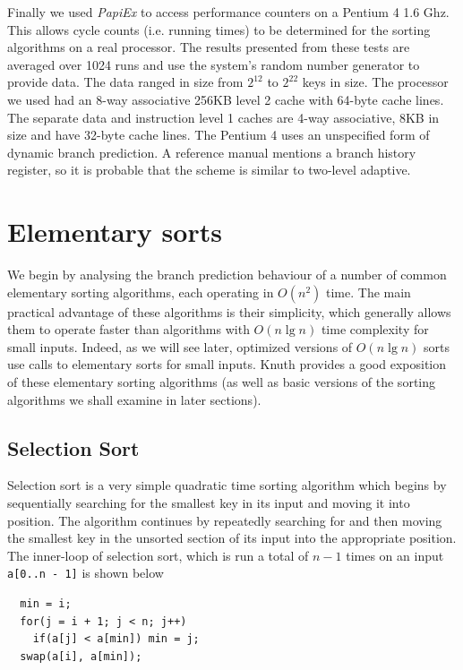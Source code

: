 \documentclass[acmtocl]{acmtrans2m}
\begin{document}
Finally we used \textit{PapiEx} \cite{PapiExManual} to access performance
counters on a Pentium 4 1.6 Ghz. This allows cycle counts (i.e. running times)
to be determined for the sorting algorithms on a real processor.  The results
presented from these tests are averaged over 1024 runs and use the system's
random number generator to provide data. The data ranged in size from $2^{12}$
to $2^{22}$ keys in size.  The processor we used had an 8-way associative 256KB
level 2 cache with 64-byte cache lines. The separate data and instruction level
1 caches are 4-way associative, 8KB in size and have 32-byte cache lines.  The
Pentium 4 uses an unspecified form of dynamic branch prediction. A reference
manual \cite{Intel248966-010} mentions a branch history register, so it is
probable that the scheme is similar to two-level adaptive.


\section{Elementary sorts}

We begin by analysing the branch prediction behaviour of a number of common
elementary sorting algorithms, each operating in $O(n^2)$ time. The main
practical advantage of these algorithms is their simplicity, which generally
allows them to operate faster than algorithms with $O(n \lg n)$ time complexity
for small inputs. Indeed, as we will see later, optimized versions of 
$O(n \lg n)$ sorts use calls to elementary sorts for small inputs.  Knuth
\citeyear{KnuthVol3_98} provides a good exposition of these elementary sorting
algorithms (as well as basic versions of the sorting algorithms we shall examine
in later sections).

\subsection{Selection Sort}
\label{selection_sort}

Selection sort is a very simple quadratic time sorting algorithm which begins by
sequentially searching for the smallest key in its input and moving it into
position. The algorithm continues by repeatedly searching for and then moving
the smallest key in the unsorted section of its input into the appropriate
position. The inner-loop of selection sort, which is run a total of $n - 1$
times on an input \texttt{a[0..n - 1]} is shown below

\begin{verbatim}
  min = i;
  for(j = i + 1; j < n; j++)
    if(a[j] < a[min]) min = j;
  swap(a[i], a[min]);
\end{verbatim}
\end{document}
